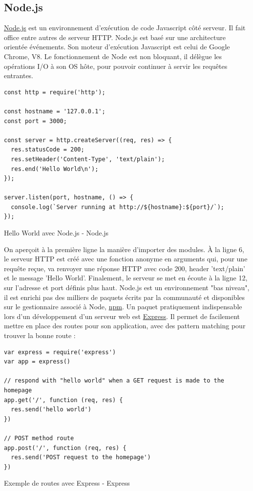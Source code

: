 \documentclass[a4paper, 12pt]{article}
\newenvironment{code}{\captionsetup{type=listing}}{}
\begin{document}
\subsection{Node.js}
\href{https://nodejs.org/en/}{Node.js} est un environnement d'exécution de code Javascript côté serveur. Il fait office entre autres de serveur HTTP.
Node.js est basé sur une architecture orientée événements. Son moteur d'exécution Javascript est celui de Google Chrome, V8.
Le fonctionnement de Node est non bloquant, il délègue les opérations I/O à son OS hôte, pour pouvoir continuer à servir
les requêtes entrantes.
\begin{code}
    \begin{verbatim}
const http = require('http');

const hostname = '127.0.0.1';
const port = 3000;

const server = http.createServer((req, res) => {
  res.statusCode = 200;
  res.setHeader('Content-Type', 'text/plain');
  res.end('Hello World\n');
});

server.listen(port, hostname, () => {
  console.log(`Server running at http://${hostname}:${port}/`);
});
    \end{verbatim}
    \caption{Hello World avec Node.js - Node.js \cite{ref170}}
\end{code}
\bigbreak
On aperçoit à la première ligne la manière d'importer des modules. À la ligne 6, le serveur HTTP est créé avec
une fonction anonyme en arguments qui, pour une requête reçue, va renvoyer une réponse HTTP avec code 200, header
'text/plain' et le message 'Hello World'. Finalement, le serveur se met en écoute à la ligne 12, sur l'adresse et
port définis plus haut. Node.js est un environnement "bas niveau", il est enrichi pas des milliers de paquets écrits
par la communauté et disponibles sur le gestionnaire associé à Node, \href{https://www.npmjs.com/}{npm}. Un paquet
pratiquement indispensable lors d'un développement d'un serveur web est \href{http://expressjs.com/}{Express}. Il
permet de facilement mettre en place des routes pour son application, avec des pattern matching pour trouver la bonne
route :
\begin{code}
    \begin{verbatim}
var express = require('express')
var app = express()

// respond with "hello world" when a GET request is made to the homepage
app.get('/', function (req, res) {
  res.send('hello world')
})

// POST method route
app.post('/', function (req, res) {
  res.send('POST request to the homepage')
})
    \end{verbatim}
    \caption{Exemple de routes avec Express - Express \cite{ref180}}
\end{code}
\bigbreak
\end{document}
